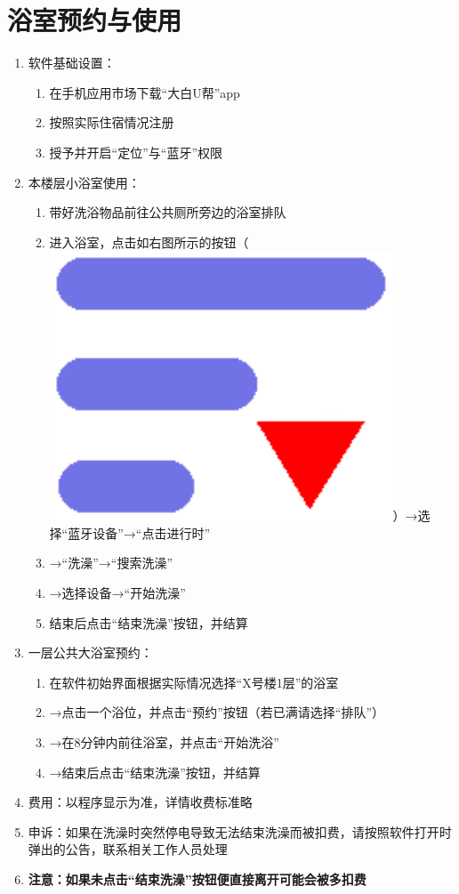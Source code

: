 \section[浴室预约与使用]{浴室预约与使用}
\label{wash_software}
\begin{enumerate}
    \item 软件基础设置：
          \begin{enumerate}
              \item 在手机应用市场下载“大白U帮”app
              \item 按照实际住宿情况注册
              \item 授予并开启“定位”与“蓝牙”权限
          \end{enumerate}
    \item 本楼层小浴室使用：
          \begin{enumerate}
              \item 带好洗浴物品前往公共厕所旁边的浴室排队
              \item 进入浴室，点击如右图所示的按钮（\mbox{\includegraphics[height=2.4ex]{bath.pdf}}）→选择“蓝牙设备”→“点击进行时”
              \item →“洗澡”→“搜索洗澡”\footnotemark
              \item →选择设备\footnotemark →“开始洗澡”
              \item 结束后点击“结束洗澡”按钮，并结算
          \end{enumerate}
    \item 一层公共大浴室预约：
          \begin{enumerate}
              \item 在软件初始界面根据实际情况选择“X号楼1层”的浴室
              \item →点击一个浴位，并点击“预约”按钮（若已满请选择“排队”）
              \item →在8分钟内前往浴室，并点击“开始洗浴”
              \item →结束后点击“结束洗澡”按钮，并结算
          \end{enumerate}
    \item 费用：以程序显示为准，详情收费标准略
    \item 申诉：如果在洗澡时突然停电导致无法结束洗澡而被扣费，请按照软件打开时弹出的公告，联系相关工作人员处理
    \item \textbf{注意：如果未点击“结束洗澡”按钮便直接离开可能会被多扣费}
\end{enumerate}


